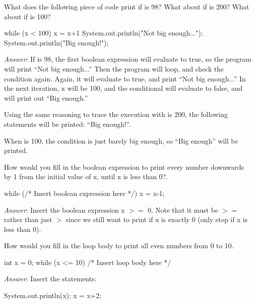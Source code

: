 \begin{example}
What does the following piece of code print if  is 98? What about if  is 200? What about if  is 100?

\begin{code}
while (x < 100) {
    x = x+1
    System.out.println("Not big enough...");
} 
System.out.println("Big enough!");
\end{code}

\emph{Answer}: If  is 98, the first boolean expression will evaluate to
true, so the program will print ``Not big enough...'' Then the program will
loop, and check the condition again.  Again, it will evaluate to true, and print
``Not big enough...'' In the next iteration, x will be 100, and the conditional
will evaluate to false, and will print out ``Big enough.''

Using the same reasoning to trace the execution with  is 200, the
following statements will be printed: ``Big enough!''.

When  is 100, the condition is just barely big enough, so ``Big enough''
will be printed.
\end{example}

\begin{example}
How would you fill in the boolean expression to print every number downwards by 1 from the initial value of x, until x is less than 0?.

\begin{code}
while (/* Insert boolean expression here */) {
    x = x-1;
} 
\end{code}

\emph{Answer}: Insert the boolean expression x $>=$ 0. Note that it must be $>=$ rather than just $>$ since we still want to print if x is exactly 0 (only stop if x is less than 0). 
\end{example}

\begin{example}
How would you fill in the loop body to print all even numbers from 0 to 10.

\begin{code}
int x = 0;
while (x <= 10) {
    /* Insert loop body here */
} 
\end{code}

\emph{Answer}: Insert the statements:
\begin{code}
  System.out.println(x);
  x = x+2;
\end{code}
\end{example}

